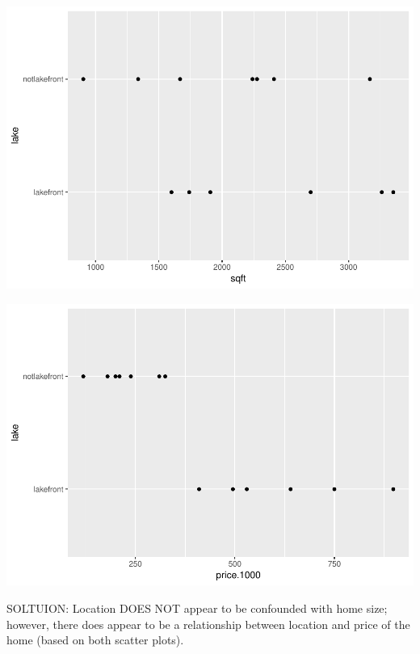 \documentclass[]{article}
\newenvironment{Shaded}{\begin{snugshade}}{\end{snugshade}}
\newcommand{\KeywordTok}[1]{\textcolor[rgb]{0.13,0.29,0.53}{\textbf{#1}}}
\newcommand{\DataTypeTok}[1]{\textcolor[rgb]{0.13,0.29,0.53}{#1}}
\newcommand{\DecValTok}[1]{\textcolor[rgb]{0.00,0.00,0.81}{#1}}
\newcommand{\StringTok}[1]{\textcolor[rgb]{0.31,0.60,0.02}{#1}}
\newcommand{\OperatorTok}[1]{\textcolor[rgb]{0.81,0.36,0.00}{\textbf{#1}}}
\newcommand{\NormalTok}[1]{#1}
\begin{document}
\includegraphics{Michigan_Home_Prices_files/figure-latex/unnamed-chunk-10-1.pdf}

\begin{Shaded}
\end{Shaded}

\includegraphics{Michigan_Home_Prices_files/figure-latex/unnamed-chunk-10-2.pdf}

SOLTUION: Location DOES NOT appear to be confounded with home size;
however, there does appear to be a relationship between location and
price of the home (based on both scatter plots).
\end{document}
